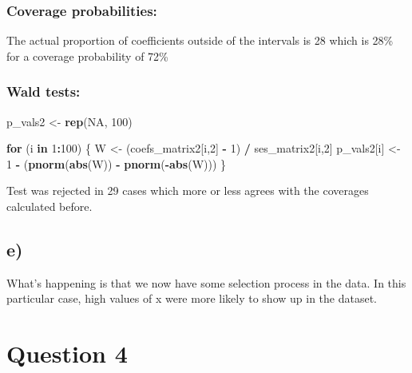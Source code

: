 \documentclass[]{article}
\newenvironment{Shaded}{\begin{snugshade}}{\end{snugshade}}
\newcommand{\ControlFlowTok}[1]{\textcolor[rgb]{0.13,0.29,0.53}{\textbf{#1}}}
\newcommand{\DecValTok}[1]{\textcolor[rgb]{0.00,0.00,0.81}{#1}}
\newcommand{\KeywordTok}[1]{\textcolor[rgb]{0.13,0.29,0.53}{\textbf{#1}}}
\newcommand{\NormalTok}[1]{#1}
\newcommand{\OperatorTok}[1]{\textcolor[rgb]{0.81,0.36,0.00}{\textbf{#1}}}
\newcommand{\OtherTok}[1]{\textcolor[rgb]{0.56,0.35,0.01}{#1}}
\newcommand{\StringTok}[1]{\textcolor[rgb]{0.31,0.60,0.02}{#1}}
\begin{document}
\hypertarget{coverage-probabilities}{%
\subsubsection{Coverage probabilities:}\label{coverage-probabilities}}

The actual proportion of coefficients outside of the intervals is 28
which is 28\% for a coverage probability of 72\%

\hypertarget{wald-tests}{%
\subsubsection{Wald tests:}\label{wald-tests}}

\begin{Shaded}
\begin{Highlighting}[]
\NormalTok{p_vals2 <-}\StringTok{ }\KeywordTok{rep}\NormalTok{(}\OtherTok{NA}\NormalTok{, }\DecValTok{100}\NormalTok{)}


\ControlFlowTok{for}\NormalTok{ (i }\ControlFlowTok{in} \DecValTok{1}\OperatorTok{:}\DecValTok{100}\NormalTok{) \{}
\NormalTok{    W <-}\StringTok{ }\NormalTok{(coefs_matrix2[i,}\DecValTok{2}\NormalTok{] }\OperatorTok{-}\StringTok{ }\DecValTok{1}\NormalTok{) }\OperatorTok{/}\StringTok{ }\NormalTok{ses_matrix2[i,}\DecValTok{2}\NormalTok{]}
\NormalTok{    p_vals2[i] <-}\StringTok{ }\DecValTok{1} \OperatorTok{-}\StringTok{ }\NormalTok{(}\KeywordTok{pnorm}\NormalTok{(}\KeywordTok{abs}\NormalTok{(W)) }\OperatorTok{-}\StringTok{ }\KeywordTok{pnorm}\NormalTok{(}\OperatorTok{-}\KeywordTok{abs}\NormalTok{(W)))}
\NormalTok{\}}
\end{Highlighting}
\end{Shaded}

Test was rejected in 29 cases which more or less agrees with the
coverages calculated before.

\hypertarget{e}{%
\subsection{e)}\label{e}}

What's happening is that we now have some selection process in the data.
In this particular case, high values of x were more likely to show up in
the dataset.

\hypertarget{question-4}{%
\section{Question 4}\label{question-4}}
\end{document}
